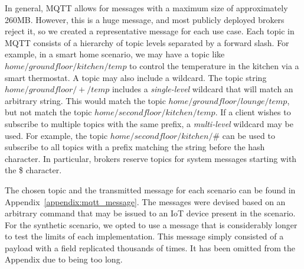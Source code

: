 In general, MQTT allows for messages with a maximum size of approximately 260MB.
However, this is a huge message, and most publicly deployed brokers reject it, so we created a representative message for each use case.
Each topic in MQTT consists of a hierarchy of topic levels separated by a forward slash.
For example, in a smart home scenario, we may have a topic like $home/groundfloor/kitchen/temp$ to control the temperature in the kitchen via a smart thermostat.
A topic may also include a wildcard.
The topic string $home/groundfloor/+/temp$ includes a \textit{single-level} wildcard that will match an arbitrary string.
This would match the topic $home/groundfloor/lounge/temp$, but not match the topic $home/secondfloor/kitchen/temp$.
If a client wishes to subscribe to multiple topics with the same prefix, a \textit{multi-level} wildcard may be used.
For example, the topic $home/secondfloor/kitchen/\#$ can be used to subscribe to all topics with a prefix matching the string before the hash character.
In particular, brokers reserve topics for system messages starting with the \$ character.

The chosen topic and the transmitted message for each scenario can be found in Appendix~\ref{appendix:mqtt_message}.
The messages were devised based on an arbitrary command that may be issued to an IoT device present in the scenario.
For the synthetic scenario, we opted to use a message that is considerably longer to test the limits of each implementation.
This message simply consisted of a payload with a field replicated thousands of times.
It has been omitted from the Appendix due to being too long.